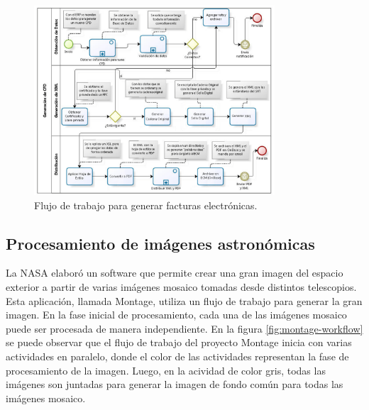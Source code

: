 \begin{figure}
    \begin{center}
        \includegraphics[width=0.8\textwidth]{imagenes/cfd-workflow}
    \end{center}
    \caption{Flujo de trabajo para generar facturas electrónicas.}
    \label{fig:cfd-workflow}
\end{figure}

\subsection{Procesamiento de imágenes astronómicas}

La NASA elaboró un software que permite crear una gran imagen del espacio exterior a partir de varias imágenes mosaico tomadas desde distintos telescopios. Esta aplicación, llamada Montage, utiliza un flujo de trabajo para generar la gran imagen. En la fase inicial de procesamiento, cada una de las imágenes mosaico puede ser procesada de manera independiente. En la figura \ref{fig:montage-workflow} se puede observar que el flujo de trabajo del proyecto Montage inicia con varias actividades en paralelo, donde el color de las actividades representan la fase de procesamiento de la imagen. Luego, en la acividad de color gris, todas las imágenes son juntadas para generar la imagen de fondo común para todas las imágenes mosaico.


